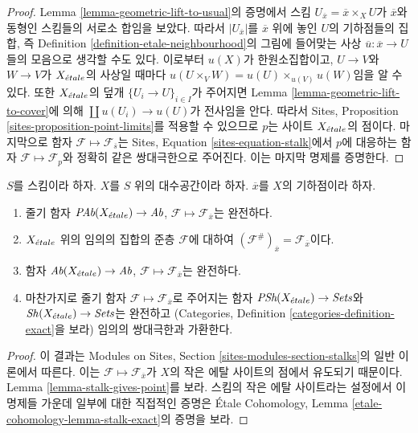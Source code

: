 \begin{proof}
Lemma \ref{lemma-geometric-lift-to-usual}의 증명에서 스킴
$U_{\overline{x}} = \overline{x} \times_X U$가
$\overline{x}$와 동형인 스킴들의 서로소 합임을 보았다.
따라서 $|U_{\overline{x}}|$를 $\overline{x}$ 위에 놓인
$U$의 기하점들의 집합, 즉 Definition
\ref{definition-etale-neighbourhood}의 그림에 들어맞는 사상
$\overline{u} : \overline{x} \to U$들의 모음으로 생각할 수도 있다.
이로부터 $u(X)$가 한원소집합이고,
$U \to V$와 $W \to V$가 $X_{\acute{e}tale}$의 사상일 때마다
$u(U \times_V W) = u(U) \times_{u(V)} u(W)$임을 알 수 있다.
또한 $X_{\acute{e}tale}$의 덮개 $\{U_i \to U\}_{i \in I}$가 주어지면
Lemma \ref{lemma-geometric-lift-to-cover}에 의해
$\coprod u(U_i) \to u(U)$가 전사임을 안다.
따라서 Sites, Proposition \ref{sites-proposition-point-limits}를
적용할 수 있으므로 $p$는 사이트 $X_{\acute{e}tale}$의 점이다.
마지막으로
함자 $\mathcal{F} \mapsto \mathcal{F}_{\overline{s}}$는
Sites, Equation \ref{sites-equation-stalk}에서 $p$에 대응하는 함자
$\mathcal{F} \mapsto \mathcal{F}_p$와 정확히 같은 쌍대극한으로
주어진다. 이는 마지막 명제를 증명한다.
\end{proof}

\begin{lemma}
\label{lemma-stalk-exact}
$S$를 스킴이라 하자.
$X$를 $S$ 위의 대수공간이라 하자.
$\overline{x}$를 $X$의 기하점이라 하자.
\begin{enumerate}
\item 줄기 함자
$\textit{PAb}(X_{\acute{e}tale}) \to \textit{Ab}$,
$\mathcal{F}  \mapsto  \mathcal{F}_{\overline{x}}$는 완전하다.
\item $X_{\acute{e}tale}$ 위의 임의의 집합의 준층 $\mathcal{F}$에 대하여
$(\mathcal{F}^\#)_{\overline{x}} = \mathcal{F}_{\overline{x}}$이다.
\item 함자
$\textit{Ab}(X_{\acute{e}tale}) \to \textit{Ab}$,
$\mathcal{F} \mapsto \mathcal{F}_{\overline{x}}$는 완전하다.
\item 마찬가지로 줄기 함자
$\mathcal{F} \mapsto \mathcal{F}_{\overline{x}}$로 주어지는 함자
$\textit{PSh}(X_{\acute{e}tale}) \to \textit{Sets}$와
$\mathop{\mathit{Sh}}\nolimits(X_{\acute{e}tale}) \to \textit{Sets}$는 완전하고
(Categories, Definition \ref{categories-definition-exact}을 보라)
임의의 쌍대극한과 가환한다.
\end{enumerate}
\end{lemma}

\begin{proof}
이 결과는 Modules on Sites, Section
\ref{sites-modules-section-stalks}의 일반 이론에서 따른다.
이는 $\mathcal{F} \mapsto \mathcal{F}_{\overline{x}}$가
$X$의 작은 에탈 사이트의 점에서 유도되기 때문이다.
Lemma \ref{lemma-stalk-gives-point}를 보라.
스킴의 작은 에탈 사이트라는 설정에서 이 명제들 가운데 일부에 대한
직접적인 증명은 \'Etale Cohomology, Lemma
\ref{etale-cohomology-lemma-stalk-exact}의 증명을 보라.
\end{proof}

